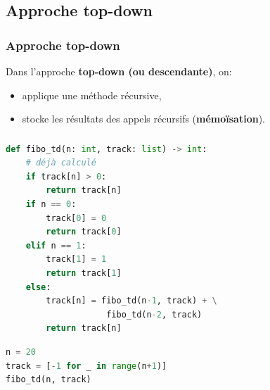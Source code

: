 \documentclass[svgnames,11pt]{beamer}
\begin{document}
\subsection{Approche top-down}
\begin{frame}
    \frametitle{Approche top-down}

    
    \begin{aretenir}[]
    Dans l'approche \textbf{top-down (ou descendante)}, on:
    \begin{itemize}
        \item applique une méthode récursive,
        \item stocke les résultats des appels récursifs (\textbf{mémoïsation}).
    \end{itemize}
    \end{aretenir}

\end{frame}
\begin{frame}[fragile]
    \frametitle{}
\begin{center}
\begin{lstlisting}[language=Python , basicstyle=\ttfamily\small, xleftmargin=0.2em, xrightmargin=0em]
def fibo_td(n: int, track: list) -> int:
    # déjà calculé
    if track[n] > 0:
        return track[n]
    if n == 0:
        track[0] = 0
        return track[0]
    elif n == 1:
        track[1] = 1
        return track[1]
    else:
        track[n] = fibo_td(n-1, track) + \
                    fibo_td(n-2, track)
        return track[n]
\end{lstlisting}
\end{center}
\end{frame}
\begin{frame}[fragile]
    
\begin{center}
    \begin{lstlisting}[language=Python , basicstyle=\ttfamily\small, xleftmargin=0.2em, xrightmargin=2em]
n = 20
track = [-1 for _ in range(n+1)]
fibo_td(n, track)
\end{lstlisting}
    \label{CODE}
    \end{center}
\end{frame}
\end{document}
